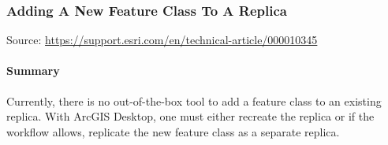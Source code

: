 \subsubsection[Adding A New Feature Class To A Replica]{\Large Adding A New Feature Class To A Replica}
Source:
\href{https://support.esri.com/en/technical-article/000010345}{https://support.esri.com/en/technical-article/000010345}
\begin{adjmulticols}{2}{\innerMar}{\outerMar}
\paragraph[Summary]{Summary \texorpdfstring{\\}{}}
Currently, there is no out-of-the-box tool to add a feature class to an existing replica. With ArcGIS Desktop, one must either recreate the replica or if the workflow allows, replicate the new feature class as a separate replica.

\end{adjmulticols}
